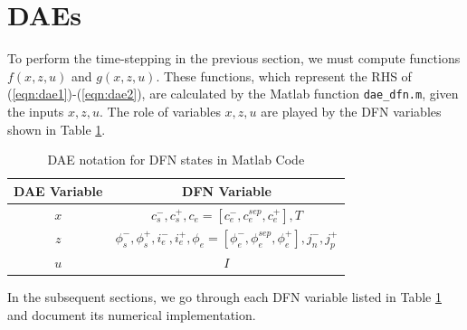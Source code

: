 \documentclass[12pt]{article}
\begin{document}
\section{DAEs}\label{sec:daes}
To perform the time-stepping in the previous section, we must compute functions $f(x,z,u)$ and $g(x,z,u)$. These functions, which represent the RHS of (\ref{eqn:dae1})-(\ref{eqn:dae2}), are calculated by the Matlab function \texttt{dae\_dfn.m}, given the inputs $x,z,u$. The role of variables $x,z,u$ are played by the DFN variables shown in Table \ref{tbl:dae-notation}.

\begin{table}[h]
\caption{DAE notation for DFN states in Matlab Code}
\begin{center}
\begin{tabular}{c|c}
\hline \hline
\textbf{DAE Variable} & \textbf{DFN Variable} \\
\hline
$x$ & $c_{s}^{-}, c_{s}^{+}, c_{e} = [c_{e}^{-}, c_{e}^{sep}, c_{e}^{+}], T$ \\
$z$ & $\phi_{s}^{-}, \phi_{s}^{+}, i_{e}^{-}, i_{e}^{+}, \phi_{e} = [\phi_{e}^{-}, \phi_{e}^{sep}, \phi_{e}^{+}], j_{n}^{-}, j_{p}^{+}$ \\
$u$ & $I$ \\
\hline \hline
\end{tabular}
\end{center}
\label{tbl:dae-notation}
\end{table}%

In the subsequent sections, we go through each DFN variable listed in Table \ref{tbl:dae-notation} and document its numerical implementation.

\end{document}
